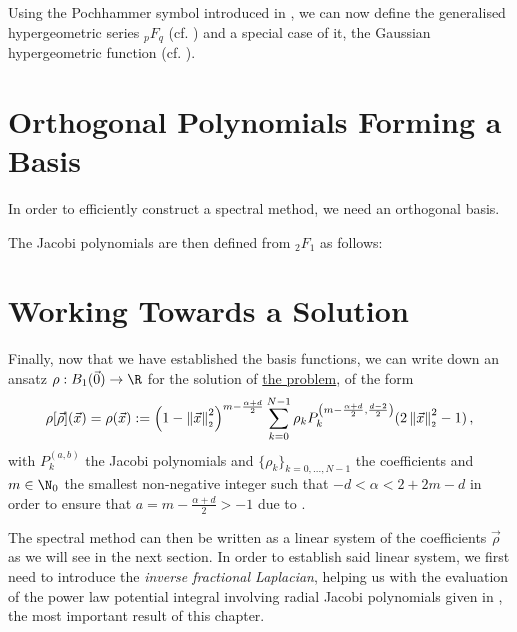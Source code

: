 Using the Pochhammer symbol introduced in , we can now define the generalised hypergeometric series ${}_pF_q$ (cf. ) and a special case of it, the Gaussian hypergeometric function (cf. ).



\pagebreak
\section{Orthogonal Polynomials Forming a Basis}
In order to efficiently construct a spectral method, we need an orthogonal basis.



The Jacobi polynomials are then defined from ${}_2F_1$ as follows:



\section{Working Towards a Solution}
Finally, now that we have established the basis functions, we can write down an ansatz $\rho: B_1(\vec{0}) \to \R$ for the solution of \hyperref[def:the-problem]{the problem}, of the form
\begin{equation}
  \rho[\vec{\rho}](\vec{x}) = \rho(\vec{x}) := \left(1-\left\lVert\vec{x}\right\rVert_{\scriptscriptstyle 2}^{2}\right)^{m - \frac{\alpha + d}{2}} \sum_{k=0}^{N-1} \rho_k P_{k}^{\left(m - \frac{\alpha + d}{2},\frac{d-2}{2}\right)}(2 \left\lVert\vec{x}\right\rVert_{\scriptscriptstyle 2}^{2}-1)\,,
  \label{eq:ansatz}
\end{equation}
with $P_k^{(a, b)}$ the Jacobi polynomials and $\{\rho_k\}_{k=0, ..., N-1}$ the coefficients and $m \in \N_0$ the smallest non-negative integer such that $-d < \alpha < 2 +  2m - d$ in order to ensure that $a = m - \frac{\alpha+d}{2} > -1$ due to .

The spectral method can then be written as a linear system of the coefficients $\vec{\rho}$ as we will see in the next section.
In order to establish said linear system, we first need to introduce the \textit{inverse fractional Laplacian}, helping us with the evaluation of the power law potential integral involving radial Jacobi polynomials given in , the most important result of this chapter.

